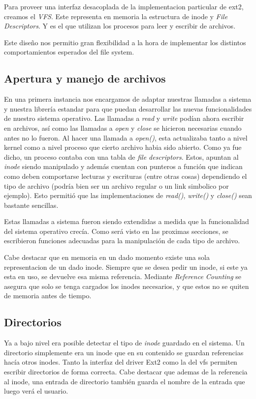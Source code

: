 \documentclass[a4paper,10pt]{article}
\begin{document}
Para proveer una interfaz desacoplada de la implementacion particular de ext2, creamos el \textit{VFS}.
Este representa en memoria la estructura de inode y \textit{File Descriptors}.
Y es el que utilizan los procesos para leer y escribir de archivos.

Este diseño nos permitio gran flexibilidad a la hora de implementar los distintos comportamientos esperados del file system.

\subsection{Apertura y manejo de archivos}
En una primera instancia nos encargamos de adaptar nuestras llamadas a sistema y nuestra librería estandar
para que puedan desarrollar las nuevas funcionalidades de nuestro sistema operativo.
Las llamadas a \textit{read} y \textit{write} podían ahora escribir en archivos, así como las llamadas a \textit{open} y \textit{close} se hicieron
necesarias cuando antes no lo fueron.
Al hacer una llamada a \textit{open()}, esta actualizaba tanto a nivel kernel como a nivel proceso que cierto archivo habia sido abierto. 
Como ya fue dicho, un proceso contaba con una tabla de \textit{file descriptors}. 
Estos, apuntan al \textit{inode} siendo manipulado y además cuentan con punteros a función que indican como deben comportarse lecturas y escrituras (entre otras cosas) dependiendo el tipo de archivo 
(podría bien ser un archivo regular o un link simbolico por ejemplo). 
Esto permitió que las implementaciones de \textit{read()}, \textit{write()} y \textit{close()} sean bastante sencillas. 
    
Estas llamadas a sistema fueron siendo extendidas a medida que la funcionalidad del sistema operativo crecía. 
Como será visto en las proximas secciones, se escribieron funciones adecuadas para la manipulación de cada tipo de archivo.

Cabe destacar que en memoria en un dado momento existe una sola representacion de un dado inode.
Siempre que se desea pedir un inode, si este ya esta en uso, se devuelve esa misma referencia.
Mediante \textit{Reference Counting} se asegura que solo se tenga cargados los inodes necesarios, y que estos no se quiten de memoria antes de tiempo.

\subsection{Directorios}

Ya a bajo nivel era posible detectar el tipo de \textit{inode} guardado en el sistema. Un directorio simplemente era
un inode que en su contenido se guardan referencias hacía otros inodes. Tanto la interfaz del driver Ext2 como la del
vfs permiten escribir directorios de forma correcta. Cabe destacar que ademas de la referencia al inode, una entrada
de directorio también guarda el nombre de la entrada que luego verá el usuario.
\end{document}
